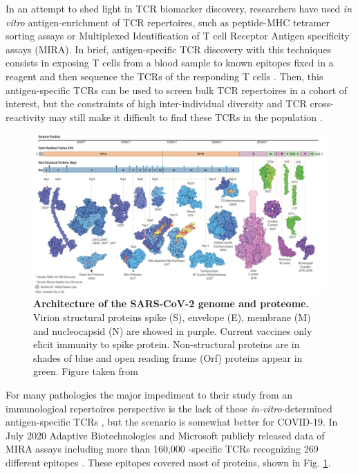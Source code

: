 
In an attempt to shed light in TCR biomarker discovery, researchers have used \textit{in vitro} antigen-enrichment of TCR repertoires, such as peptide-MHC tetramer sorting assays or Multiplexed Identification of T cell Receptor Antigen specificity assays (MIRA). In brief, antigen-specific TCR discovery with this techniques consists in exposing T cells from a blood sample to known epitopes fixed in a reagent and then sequence the TCRs of the responding T cells \citep{miratech}. Then, this antigen-specific TCRs can be used to screen bulk TCR repertoires in a cohort of interest, but the constraints of high inter-individual diversity and TCR cross-reactivity may still make it difficult to find these TCRs in the population \citep{metaclonotypes}.

\begin{figure}[!t]
	\centering
	\includegraphics[width=\textwidth,keepaspectratio]{figures/covid_proteome-min.png}
	\caption{\textbf{Architecture of the SARS-CoV-2 genome and proteome.} Virion structural proteins spike (S), envelope (E), membrane (M) and nucleocapsid (N) are showed in purple. Current vaccines only elicit immunity to spike protein. Non-structural proteins are in shades of blue and open reading frame (Orf) proteins appear in green. Figure taken from \cite{covid3d}}
	\label{fig:covidprot}
\end{figure}

For many pathologies the major impediment to their study from an immunological repertoires perspective is the lack of these \textit{in-vitro}-determined antigen-specific TCRs \citep{tcrml}, but the scenario is somewhat better for COVID-19. In July 2020 Adaptive Biotechnologies and Microsoft publicly released data of MIRA assays including more than 160,000 \covid-specific TCRs recognizing 269 different \covid{} epitopes \citep{immunecode}. These epitopes covered most of \covid{} proteins, shown in Fig. \ref{fig:covidprot}.

